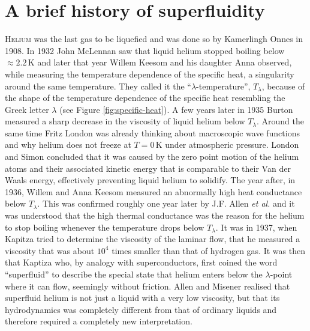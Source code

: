 \documentclass[12pt,a4paper,twosides]{book}
\newcommand{\unit}[1]{\,\mathrm{#1}}
\begin{document}
	\section{A brief history of superfluidity}
		\lettrine[lines=3,findent=3pt,nindent=0pt]{H}{elium} was the last gas to be liquefied and was done so by Kamerlingh Onnes in 1908\citep{Onnes1908,Onnes1909}. In 1932 John McLennan saw that liquid helium stopped boiling below $\approx\!2.2\unit{K}$\citep{McLennan1932} and later that year Willem Keesom and his daughter Anna observed, while measuring the temperature dependence of the specific heat, a singularity around the same temperature\citep{Keesom1932}. They called it the ``$\lambda$-temperature'',  $T_\lambda$, because of the shape of the temperature dependence of the specific heat resembling the Greek letter $\lambda$ (see Figure \ref{fig:specific-heat}). A few years later in 1935 Burton measured a sharp decrease in the viscosity of liquid helium below $T_\lambda$\citep{Burton1935}. Around the same time Fritz London was already thinking about macroscopic wave functions and why helium does not freeze at $T=0\unit{K}$ under atmospheric pressure\citep{London1935}. London and Simon concluded that it was caused by the zero point motion of the helium atoms and their associated kinetic energy that is comparable to their Van der Waals energy, effectively preventing liquid helium to solidify\citep{Simon1934,London1936}. The year after, in 1936, Willem and Anna Keesom measured an abnormally high heat conductance below $T_\lambda$\citep{Keesom1936}. This was confirmed roughly one year later by J.F. Allen \emph{et al.}\citep{Allen1937} and it was understood that the high thermal conductance was the reason for the helium to stop boiling whenever the temperature drops below $T_\lambda$. It was in 1937, when Kapitza tried to determine the viscosity of the laminar flow, that he measured a viscosity that was about $10^4$ times smaller than that of hydrogen gas\citep{Kapitza1938}. It was then that Kaptiza who, by analogy with superconductors, first coined the word ``superfluid''\citep{Kapitza1938} to describe the special state that helium enters below the $\lambda$-point where it can flow, seemingly without friction. Allen and Misener realised that superfluid helium is not just a liquid with a very low viscosity, but that its hydrodynamics was completely different from that of ordinary liquids\citep{Allen1938} and therefore required a completely new interpretation.\\
		
\end{document}

